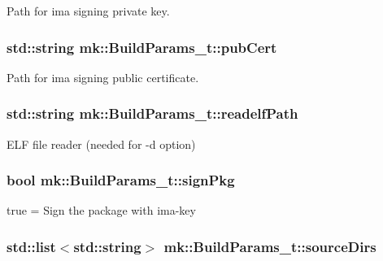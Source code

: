 Path for ima signing private key. 

\subsubsection[{\texorpdfstring{pub\+Cert}{pubCert}}]{\setlength{\rightskip}{0pt plus 5cm}std\+::string mk\+::\+Build\+Params\+\_\+t\+::pub\+Cert}\hypertarget{structmk_1_1_build_params__t_a77859f79ebcc7c733ea4a451917a5b92}{}\label{structmk_1_1_build_params__t_a77859f79ebcc7c733ea4a451917a5b92}


Path for ima signing public certificate. 

\subsubsection[{\texorpdfstring{readelf\+Path}{readelfPath}}]{\setlength{\rightskip}{0pt plus 5cm}std\+::string mk\+::\+Build\+Params\+\_\+t\+::readelf\+Path}\hypertarget{structmk_1_1_build_params__t_ad49a4802c62237af2cc5c256fb3039dd}{}\label{structmk_1_1_build_params__t_ad49a4802c62237af2cc5c256fb3039dd}


E\+LF file reader (needed for -\/d option) 

\subsubsection[{\texorpdfstring{sign\+Pkg}{signPkg}}]{\setlength{\rightskip}{0pt plus 5cm}bool mk\+::\+Build\+Params\+\_\+t\+::sign\+Pkg}\hypertarget{structmk_1_1_build_params__t_affd9f90b0dbc33d60621032075c3efe3}{}\label{structmk_1_1_build_params__t_affd9f90b0dbc33d60621032075c3efe3}


true = Sign the package with ima-\/key 

\subsubsection[{\texorpdfstring{source\+Dirs}{sourceDirs}}]{\setlength{\rightskip}{0pt plus 5cm}std\+::list$<$std\+::string$>$ mk\+::\+Build\+Params\+\_\+t\+::source\+Dirs}\hypertarget{structmk_1_1_build_params__t_a1c6059bea4ddee70038a05aba561873a}{}\label{structmk_1_1_build_params__t_a1c6059bea4ddee70038a05aba561873a}


